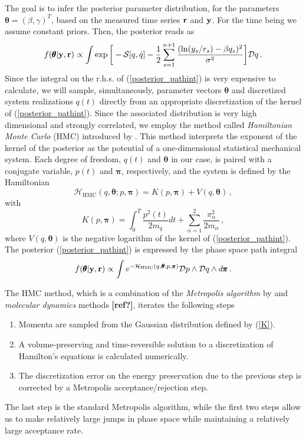 \documentclass[11pt, a4paper]{article}
\newcommand{\vc}[1]{{\bf #1 }}
\newcommand{\bt}{\pmb\theta}
\begin{document}
The goal is to infer the posterior parameter distribution, for the parameters $\bt=(\beta,\gamma)^T$, based on the measured time series $\vc r$ and $\vc y$.
For the time being we assume constant priors.
Then, the posterior reads as
\begin{equation}\label{posterior_pathint}
  f(\bt | \vc y, \vc r)
  \propto
  \int
  \exp\bigg[
    -{{\mathcal S}}[{q},\dot q]
    -\frac{1}{2}
    \sum_{s=1}^{n+1}
    \frac
    {(\ln(y_s/r_s)-{\beta q_s})^2}
    {\sigma^2}
  \bigg]
  {\mathcal Dq}
  \,.
\end{equation}
Since the integral on the r.h.s. of (\ref{posterior_pathint}) is very expensive to calculate, we will sample, simultaneously, parameter vectors $\bt$ and discretized system realizations $q(t)$ directly from an appropriate discretization of the kernel of (\ref{posterior_pathint}).
Since the associated distribution is very high dimensional and strongly correlated, we employ the method called {\em Hamiltonian Monte Carlo} (HMC) introduced by \cite{duane_1987_HMC}.
This method interprets the exponent of the kernel of the posterior as the potential of a one-dimensional statistical mechanical system. Each degree of freedom, $q(t)$ and $\bt$ in our case, is paired with a conjugate variable, $p(t)$ and ${\pmb\pi}$, respectively, and the system is defined by the  Hamiltonian
\begin{equation}\label{Hamiltonian}
    \mathcal{H}_{\text{HMC}}(q,\bt; p,{\pmb\pi})
    =
    K( p,{\pmb\pi}) + V( q,\bt)\,,
\end{equation}
with
\begin{equation}\label{K}
   K( p,{\pmb\pi})
   =
   \int_0^T \frac{ p^2(t)}{2m_q}dt
   + \sum_{\alpha=1}^2\frac{\pi_\alpha^2}{2m_\alpha}\,,
\end{equation}
where $V( q,\bt)$ is the negative logarithm of the kernel of (\ref{posterior_pathint}).
The posterior (\ref{posterior_pathint}) is expressed by the phase space path integral
\begin{equation}\label{phaseSpacePathInt}
    f(\bt | \vc y, \vc r)
  \propto
  \int
  e^{-\mathcal {H}_{\text{HMC}}(q,\bt; p,{\pmb\pi})}
  {\mathcal Dp}
  \wedge
  {\mathcal Dq}
  \wedge
  d{\pmb\pi}
  \,.
\end{equation}

The HMC method, which is a combination of the {\em Metropolis algorithm} by \cite{metropolis_1953_MRT2} and {\em molecular dynamics} methods \textbf{[ref?]}, iterates the following steps
\begin{enumerate}
  \item
  Momenta are sampled from the Gaussian distribution defined by (\ref{K}).
  \item
  A volume-preserving and time-reversible solution to a discretization of Hamilton's equations is calculated numerically.
  \item
  The discretization error on the energy preservation due to the previous step is corrected by a Metropolis acceptance/rejection step.
\end{enumerate}
The last step is the standard Metropolis algorithm, while the first two steps allow us to make relatively large jumps in phase space while maintaining a relatively large acceptance rate.
\end{document}
